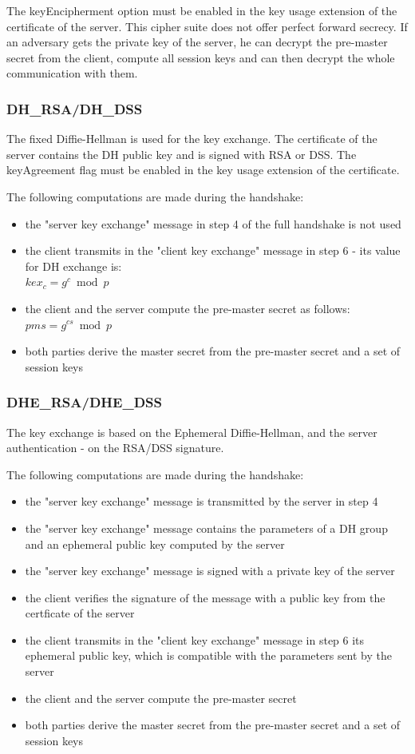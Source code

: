 The keyEncipherment option must be enabled in the key usage extension of the certificate of the server.
This cipher suite does not offer perfect forward secrecy. If an adversary gets the private key of the server, he can decrypt the pre-master secret from the client, compute all session keys and can then decrypt the whole communication with them.

\subsubsection*{DH\_RSA/DH\_DSS}
The fixed Diffie-Hellman is used for the key exchange. The certificate of the server contains the DH public key and is signed with RSA or DSS.
The keyAgreement flag must be enabled in the key usage extension of the certificate.

The following computations are made during the handshake:
\begin{itemize}
	\item the "server key exchange" message in step 4 of the full handshake is not used
	\item the client transmits in the "client key exchange" message in step 6 - its value for DH exchange is: \\ $\displaystyle kex_c = g^c \bmod p $ 
	\item the client and the server compute the pre-master secret as follows: $\displaystyle pms = g^{cs} \bmod p$
	\item both parties derive the master secret from the pre-master secret and a set of session keys
\end{itemize}

\subsubsection*{DHE\_RSA/DHE\_DSS}
The key exchange is based on the Ephemeral Diffie-Hellman, and the server authentication - on the RSA/DSS signature.

The following computations are made during the handshake:
\begin{itemize}
	\item the "server key exchange" message is transmitted by the server in step 4
	\item the "server key exchange" message contains the parameters of a DH group and an ephemeral public key computed by the server
	\item the "server key exchange" message is signed with a private key of the server
	\item the client verifies the signature of the message with a public key from the certficate of the server
	\item the client transmits in the "client key exchange" message in step 6 its ephemeral public key, which is compatible with the parameters sent by the server
	\item the client and the server compute the pre-master secret
	\item both parties derive the master secret from the pre-master secret and a set of session keys
\end{itemize}

